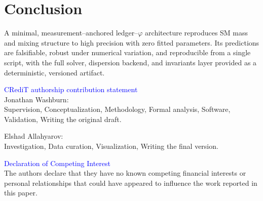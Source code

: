 \documentclass[%
 amsmath,amssymb,
 aps,
prb,
floatfix, showkeys
]{revtex4-2}
\newcommand{\modif}[1]{\textcolor{blue}{#1}}
\begin{document}
\section{Conclusion}
A minimal, measurement–anchored ledger–$\varphi$ architecture reproduces SM mass and mixing structure to high precision with zero fitted parameters. Its predictions are falsifiable, robust under numerical variation, and reproducible from a single script, with the full solver, dispersion backend, and invariants layer provided as a deterministic, versioned artifact.

\onecolumngrid




\vspace{2.0cm}

{\modif{ CRediT authorship contribution statement}} \\
Jonathan Washburn: \\
Supervision,
Conceptualization,
Methodology,
Formal analysis,
Software,
Validation,
Writing the original draft.

\vspace{0.20cm}

Elshad Allahyarov: \\
Investigation,
Data curation,
Visualization,
Writing the final version.  


{\modif{ Declaration of Competing Interest }} \\
The authors declare that they have no known competing financial interests or personal relationships that
could have appeared to influence the work reported in this paper.




\end{document}
